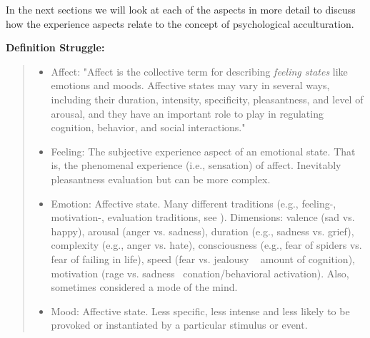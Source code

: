 \documentclass[nobib]{tufte-handout}
\begin{document}
In the next sections we will look at each of the aspects in more detail to discuss how the experience aspects relate to the concept of psychological acculturation.

\begin{framed}
    \textbf{Definition Struggle:}\\ 
    \begin{quote}
        \begin{itemize}
            \item Affect: "Affect is the collective term for describing \textit{feeling states} like emotions and moods. Affective states may vary in several ways, including their duration, intensity, specificity, pleasantness, and level of arousal, and they have an important role to play in regulating cognition, behavior, and social interactions." \citep[][p. 49]{Niven2013}
            \item Feeling: The subjective experience aspect of an emotional state. That is, the phenomenal experience (i.e., sensation) of affect. Inevitably pleasantness evaluation but can be more complex.
            \item Emotion: Affective state. Many different traditions (e.g., feeling-, motivation-, evaluation traditions, see \citealp{Scarantino2016}). Dimensions: valence (sad vs. happy), arousal (anger vs. sadness), duration (e.g., sadness vs. grief), complexity (e.g., anger vs. hate), consciousness (e.g., fear of spiders vs. fear of failing in life), speed (fear vs. jealousy ~ amount of cognition), motivation (rage vs. sadness ~conation/behavioral activation). Also, sometimes considered a mode of the mind.
            \item Mood: Affective state. Less specific, less intense and less likely to be provoked or instantiated by a particular stimulus or event.
        \end{itemize}
    \end{quote}
\end{framed}
\end{document}
